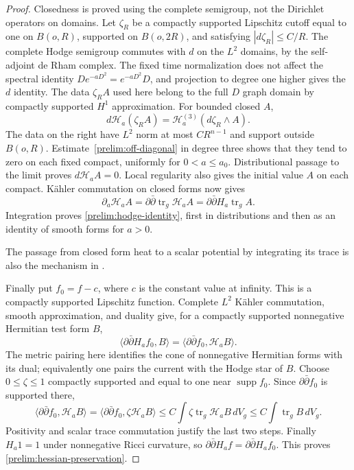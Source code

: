 \documentclass[11pt]{article}
\theoremstyle{definition}
\theoremstyle{remark}
\newcommand{\dd}{\partial\bar\partial}
\DeclareMathOperator{\tr}{tr}
\DeclareMathOperator{\supp}{supp}
\numberwithin{equation}{section}
\begin{document}
\begin{proof}
Closedness is proved using the complete semigroup, not the
Dirichlet operators on domains.  Let $\zeta_R$ be a compactly supported
Lipschitz cutoff equal to one on $B(o,R)$, supported on $B(o,2R)$,
and satisfying $|d\zeta_R|\le C/R$.  The complete Hodge semigroup
commutes with $d$ on the $L^2$ domains, by the self-adjoint de Rham
complex.
The fixed time normalization does not affect the spectral identity
$D e^{-aD^2}=e^{-aD^2}D$, and projection to degree one higher gives
the $d$ identity. The data $\zeta_RA$ used here belong to the full
$D$ graph domain by compactly supported $H^1$ approximation.
For bounded closed $A$,
\[
 d\mathcal H_a(\zeta_RA)
   =\mathcal H_a^{(3)}(d\zeta_R\wedge A).
\]
The data on the right have $L^2$ norm at most $CR^{n-1}$ and support
outside $B(o,R)$.  Estimate~\eqref{prelim:off-diagonal} in degree
three shows that they tend to zero on each fixed compact, uniformly
for $0<a\le a_0$.  Distributional passage to the limit proves
$d\mathcal H_aA=0$.  Local regularity also gives the initial value
$A$ on each compact.  K\"ahler commutation on closed forms now gives
\[
 \partial_a\mathcal H_aA=\dd\tr_g\mathcal H_aA
                         =\dd H_a\tr_g A.
\]
Integration proves \eqref{prelim:hodge-identity}, first in
distributions and then as an identity of smooth forms for $a>0$.

The passage from closed form heat to a scalar potential by integrating
its trace is also the mechanism in
\cite[Lemma~2.1 and proof of Theorem~2.1]{NiTamHodge2013}.

Finally put $f_0=f-c$, where $c$ is the constant value at infinity.
This is a compactly supported Lipschitz function.  Complete $L^2$
K\"ahler commutation, smooth approximation, and duality give, for a
compactly supported nonnegative Hermitian test form $B$,
\[
 \langle\dd H_af_0,B\rangle
       =\langle\dd f_0,\mathcal H_aB\rangle.
\]
The metric pairing here identifies the cone of nonnegative Hermitian
forms with its dual; equivalently one pairs the current with the
Hodge star of $B$.  Choose $0\le\zeta\le1$ compactly supported and
equal to one near $\supp f_0$.  Since $\dd f_0$ is supported there,
\[
 \langle\dd f_0,\mathcal H_aB\rangle
 =\langle\dd f_0,\zeta\mathcal H_aB\rangle
 \le C\int\zeta\tr_g\mathcal H_aB\,dV_g
 \le C\int\tr_gB\,dV_g.
\]
Positivity and scalar trace commutation justify the last two steps.
Finally $H_a1=1$ under nonnegative Ricci curvature, so
$\dd H_af=\dd H_af_0$.  This proves
\eqref{prelim:hessian-preservation}.
\end{proof}
\end{document}
